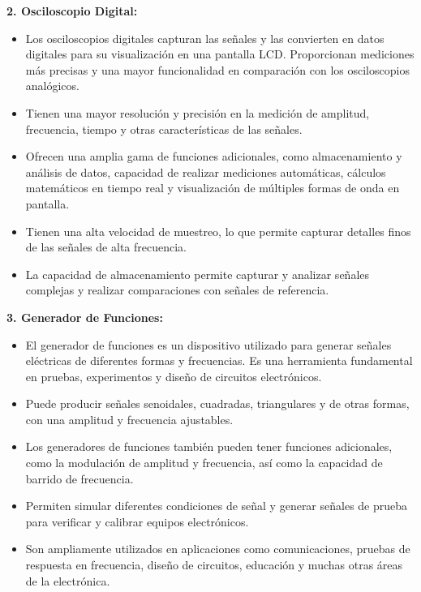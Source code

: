 \documentclass[12pt]{article}
\begin{document}
        \textbf{2. Osciloscopio Digital:}

        \begin{itemize}
            \item Los osciloscopios digitales capturan las señales y las convierten en datos digitales para su visualización en una pantalla LCD. Proporcionan mediciones más precisas y una mayor funcionalidad en comparación con los osciloscopios analógicos.
            \item Tienen una mayor resolución y precisión en la medición de amplitud, frecuencia, tiempo y otras características de las señales.
            \item Ofrecen una amplia gama de funciones adicionales, como almacenamiento y análisis de datos, capacidad de realizar mediciones automáticas, cálculos matemáticos en tiempo real y visualización de múltiples formas de onda en pantalla.
            \item Tienen una alta velocidad de muestreo, lo que permite capturar detalles finos de las señales de alta frecuencia.
            \item La capacidad de almacenamiento permite capturar y analizar señales complejas y realizar comparaciones con señales de referencia.
        \end{itemize}
        
        \textbf{3. Generador de Funciones:}

        \begin{itemize}
            \item El generador de funciones es un dispositivo utilizado para generar señales eléctricas de diferentes formas y frecuencias. Es una herramienta fundamental en pruebas, experimentos y diseño de circuitos electrónicos.
            \item Puede producir señales senoidales, cuadradas, triangulares y de otras formas, con una amplitud y frecuencia ajustables.
            \item Los generadores de funciones también pueden tener funciones adicionales, como la modulación de amplitud y frecuencia, así como la capacidad de barrido de frecuencia.
            \item Permiten simular diferentes condiciones de señal y generar señales de prueba para verificar y calibrar equipos electrónicos.
            \item Son ampliamente utilizados en aplicaciones como comunicaciones, pruebas de respuesta en frecuencia, diseño de circuitos, educación y muchas otras áreas de la electrónica.
        \end{itemize}
        
\end{document}
